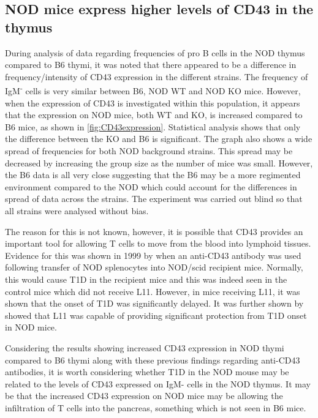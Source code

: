 \subsection{NOD mice express higher levels of CD43 in the thymus}

During analysis of data regarding frequencies of pro B cells in the NOD thymus compared to B6 thymi, it was noted that there appeared to be a difference in frequency/intensity of CD43 expression in the different strains.
The frequency of IgM\textsuperscript{-} cells is very similar between B6, NOD WT and NOD KO mice.
However, when the expression of CD43 is investigated within this population, it appears that the expression on NOD mice, both WT and KO, is increased compared to B6 mice, as shown in \cref{fig:CD43expression}.
Statistical analysis shows that only the difference between the KO and B6 is significant.
The graph also shows a wide spread of frequencies for both NOD background strains.
This spread may be decreased by increasing the group size as the number of mice was small.
However, the B6 data is all very close suggesting that the B6 may be a more regimented environment compared to the NOD which could account for the differences in spread of data across the strains.
The experiment was carried out blind so that all strains were analysed without bias.

The reason for this is not known, however, it is possible that CD43 provides an important tool for allowing T cells to move from the blood into lymphoid tissues.
Evidence for this was shown in 1999 by \citet{Mikulowska1999} when an anti-CD43 antibody was used following transfer of NOD splenocytes into NOD/scid recipient mice. 
Normally, this would cause T1D in the recipient mice and this was indeed seen in the control mice which did not receive L11.
However, in mice receiving L11, it was shown that the onset of T1D was significantly delayed.
It was further shown by \citet{Johnson1999} showed that L11 was capable of providing significant protection from T1D onset in NOD mice.

Considering the results showing increased CD43 expression in NOD thymi compared to B6 thymi along with these previous findings regarding anti-CD43 antibodies, it is worth considering whether T1D in the NOD mouse may be related to the levels of CD43 expressed on IgM- cells in the NOD thymus.
It may be that the increased CD43 expression on NOD mice may be allowing the infiltration of T cells into the pancreas, something which is not seen in B6 mice.

